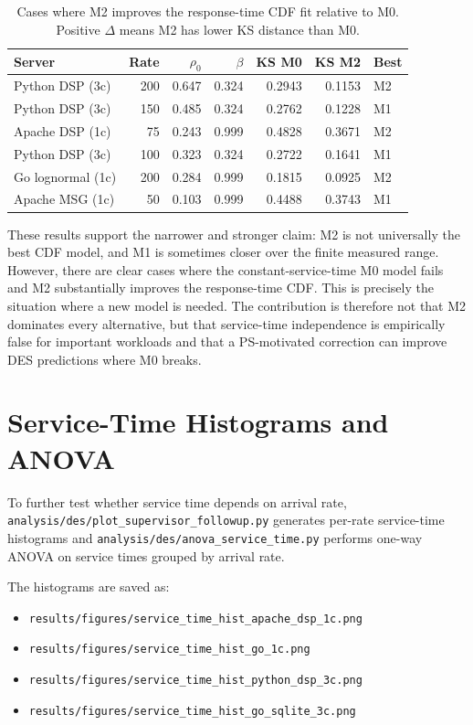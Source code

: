 \begin{table}[h]
\centering
\caption{Cases where M2 improves the response-time CDF fit relative to M0. Positive $\Delta$ means M2 has lower KS distance than M0.}
\label{tab:m2-beats-m0}
\begin{tabular}{l r r r r r l}
\toprule
\textbf{Server} & \textbf{Rate} & \textbf{$\rho_0$} & \textbf{$\beta$} & \textbf{KS M0} & \textbf{KS M2} & \textbf{Best} \\
\midrule
Python DSP (3c) & 200 & 0.647 & 0.324 & 0.2943 & 0.1153 & M2 \\
Python DSP (3c) & 150 & 0.485 & 0.324 & 0.2762 & 0.1228 & M1 \\
Apache DSP (1c) & 75  & 0.243 & 0.999 & 0.4828 & 0.3671 & M2 \\
Python DSP (3c) & 100 & 0.323 & 0.324 & 0.2722 & 0.1641 & M1 \\
Go lognormal (1c) & 200 & 0.284 & 0.999 & 0.1815 & 0.0925 & M2 \\
Apache MSG (1c) & 50 & 0.103 & 0.999 & 0.4488 & 0.3743 & M1 \\
\bottomrule
\end{tabular}
\end{table}

These results support the narrower and stronger claim: M2 is not universally the best CDF model, and M1 is sometimes closer over the finite measured range. However, there are clear cases where the constant-service-time M0 model fails and M2 substantially improves the response-time CDF. This is precisely the situation where a new model is needed. The contribution is therefore not that M2 dominates every alternative, but that service-time independence is empirically false for important workloads and that a PS-motivated correction can improve DES predictions where M0 breaks.

\section{Service-Time Histograms and ANOVA}
\label{sec:anova-service-time}

To further test whether service time depends on arrival rate, \texttt{analysis/des/plot\_supervisor\_followup.py} generates per-rate service-time histograms and \texttt{analysis/des/anova\_service\_time.py} performs one-way ANOVA on service times grouped by arrival rate.

The histograms are saved as:
\begin{itemize}
    \item \texttt{results/figures/service\_time\_hist\_apache\_dsp\_1c.png}
    \item \texttt{results/figures/service\_time\_hist\_go\_1c.png}
    \item \texttt{results/figures/service\_time\_hist\_python\_dsp\_3c.png}
    \item \texttt{results/figures/service\_time\_hist\_go\_sqlite\_3c.png}
\end{itemize}

